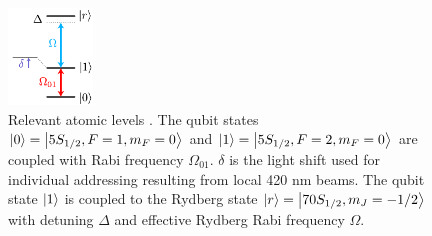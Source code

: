 \documentclass[rmp,10pt,onecolumn,fleqn,notitlepage]{revtex4-1}
\begin{document}
	\begin{figure}[h!]
	    \centering
	   \includegraphics[width=0.2\textwidth]{image/physical_implementation/atomic-levels.pdf}
	    \caption{Relevant atomic levels \cite{PhysRevLett.123.170503}.  The qubit states $\left\vert{0}\right\rangle=\left\vert{5 S_{1/2}, F=1, m_F=0}\right\rangle$ and $\left\vert{1}\right\rangle=\left\vert{5 S_{1/2}, F=2, m_F=0}\right\rangle$ are coupled with Rabi frequency $\Omega_{01}$. $\delta$ is the light shift used for individual addressing resulting from local 420 nm beams.
	    The qubit state $\left\vert{1}\right\rangle$ is coupled to the Rydberg state $\left\vert{r}\right\rangle=\left\vert{70 S_{1/2}, m_J=-1/2}\right\rangle$ with detuning $\Delta$ and effective Rydberg Rabi frequency $\Omega$.}
	    \label{fig:atomic-levels}
	\end{figure}
	
\end{document}
